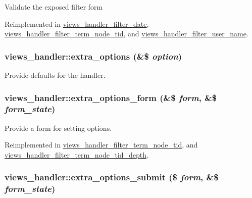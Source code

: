 Validate the exposed filter form 

Reimplemented in \hyperlink{classviews__handler__filter__date_0146f5fd6dee328506fc6f29006eb401}{views\_\-handler\_\-filter\_\-date}, \hyperlink{classviews__handler__filter__term__node__tid_b0c4583fea802e86c84fabafc4768074}{views\_\-handler\_\-filter\_\-term\_\-node\_\-tid}, and \hyperlink{classviews__handler__filter__user__name_3510a0e9b2c5fea7460a42049e0a58c0}{views\_\-handler\_\-filter\_\-user\_\-name}.\hypertarget{classviews__handler_0299b8b2ba70379a5aca4ddb5b8d95b4}{
\subsubsection[{extra\_\-options}]{\setlength{\rightskip}{0pt plus 5cm}views\_\-handler::extra\_\-options (\&\$ {\em option})}}
\label{classviews__handler_0299b8b2ba70379a5aca4ddb5b8d95b4}


Provide defaults for the handler. \hypertarget{classviews__handler_0eed1d12c47d60190f59e135d962719e}{
\subsubsection[{extra\_\-options\_\-form}]{\setlength{\rightskip}{0pt plus 5cm}views\_\-handler::extra\_\-options\_\-form (\&\$ {\em form}, \/  \&\$ {\em form\_\-state})}}
\label{classviews__handler_0eed1d12c47d60190f59e135d962719e}


Provide a form for setting options. 

Reimplemented in \hyperlink{classviews__handler__filter__term__node__tid_df599d1bef08003b1b734dfd397030a6}{views\_\-handler\_\-filter\_\-term\_\-node\_\-tid}, and \hyperlink{classviews__handler__filter__term__node__tid__depth_704c5e42a5a41ee12bd01b1b153431e4}{views\_\-handler\_\-filter\_\-term\_\-node\_\-tid\_\-depth}.\hypertarget{classviews__handler_ca642bf4dff25e0d49f7fca65bb97f77}{
\subsubsection[{extra\_\-options\_\-submit}]{\setlength{\rightskip}{0pt plus 5cm}views\_\-handler::extra\_\-options\_\-submit (\$ {\em form}, \/  \&\$ {\em form\_\-state})}}
\label{classviews__handler_ca642bf4dff25e0d49f7fca65bb97f77}


